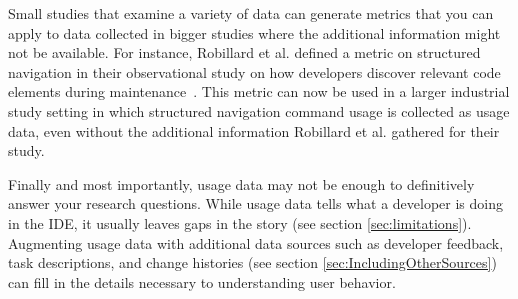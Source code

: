 

Small studies that examine a variety of data can generate metrics that you can apply to data collected in bigger studies where the additional information might not be available. 
        For instance, Robillard et al. defined a metric on structured navigation in their observational study on how developers discover relevant code elements during maintenance~\cite{wbsnipes:Robillard2004How}. This metric can now be used in a larger industrial study setting in which structured navigation command usage is collected as usage data, even without the additional information Robillard et al. gathered for their study.

Finally and most importantly, usage data may not be enough to definitively answer your research questions. While usage data tells what a developer is doing in the IDE, it usually leaves gaps in the story (see section \ref{sec:limitations}).  Augmenting usage data with additional data sources such as developer feedback, task descriptions, and change histories (see section \ref{sec:IncludingOtherSources}) can fill in the details necessary to understanding user behavior.